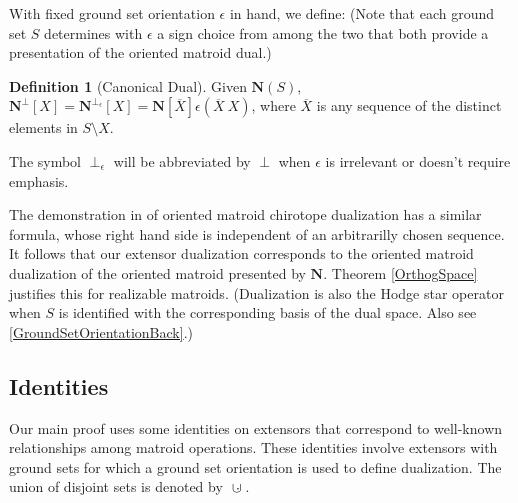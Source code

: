 \documentclass[12pt]{article}
\theoremstyle{definition}
\newtheorem{definition}[theorem]{Definition}
\newcommand{\dunion}
{\mbox{\hbox{\hskip6pt$\cdot$\hskip-5.50pt$\cup$\hskip2pt}}}
\newcommand{\scomp}[1]{\ensuremath{\overline{#1}}}
\newcommand{\scma}{\ensuremath{\ }}
\newcommand{\ext}[1]{\ensuremath{\mathbf{#1}}}
\begin{document}
With fixed ground set orientation $\epsilon$ in hand, we define: (Note
that each ground set $S$ determines with $\epsilon$ 
a sign choice from among the two 
that both provide a presentation of the
oriented matroid dual.)

\begin{definition}[Canonical Dual]
\label{definitionCanonicalDual}
Given $\ext{N}(S)$, 
$\ext{N}^\perp[X] = \ext{N}^{\perp_{\epsilon}}[X]=\ext{N}[\scomp{X}]\epsilon(\scomp{X}\scma X)$, where $\scomp{X}$ is any sequence of the distinct elements
in $S\setminus X$.

The symbol $\perp_{\epsilon}$ will be abbreviated by $\perp$ when 
$\epsilon$ is irrelevant or doesn't require emphasis.
\end{definition}

The demonstration in \cite[end of ]{OMBOOK}
of oriented matroid chirotope dualization 
has a similar formula, whose right hand side is
independent of an arbitrarilly chosen sequence.  It follows that 
our extensor dualization corresponds to the oriented
matroid dualization of the oriented matroid presented by
$\ext{N}$.  Theorem \ref{OrthogSpace} justifies this for
realizable matroids.  (Dualization is also the Hodge star 
operator\cite{HodgePedoe1}
when $S$ is identified with the corresponding basis of the dual 
space. Also see \textsection\ref{GroundSetOrientationBack}.)

\subsection{Identities}
\label{IdentitiesSect}

Our main proof uses some identities on extensors 
that correspond to well-known relationships among matroid operations.
These identities involve extensors with ground sets
for which a ground set orientation is used to define dualization.
The union of disjoint sets is denoted by $\dunion$.
\end{document}
